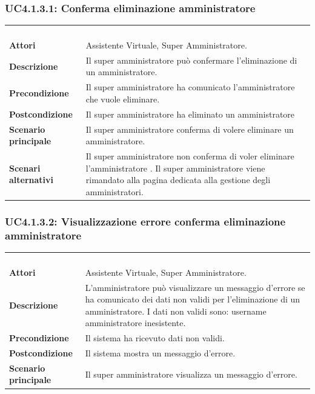 \subsubsection{UC4.1.3.1: Conferma eliminazione amministratore}
\label{UC4.1.3.1}
\begin{longtable}{l|p{10cm}}
	\rowcolor[gray]{0.8} \multicolumn{2}{c}{} \\
	\rowcolor[gray]{0.8} \multicolumn{2}{c}{\textbf{UC4.1.3.1 - Conferma eliminazione amministratore}} \\
	\rowcolor[gray]{0.8} \multicolumn{2}{c}{} \\
	\hline
	&\\
	\textbf{Attori} & Assistente Virtuale, Super Amministratore.\\[7pt]
	\textbf{Descrizione} & Il super amministratore può confermare l'eliminazione di un amministratore.\\[7pt]
	\textbf{Precondizione} & Il super amministratore ha comunicato l'amministratore che vuole eliminare.\\[7pt]
	\textbf{Postcondizione} & Il super amministratore ha eliminato un amministratore\\[7pt]
	\textbf{Scenario principale} &Il super amministratore conferma di volere eliminare un amministratore.\\[7pt]
	\textbf{Scenari alternativi} & Il super amministratore non conferma di voler eliminare l'amministratore . Il super amministratore viene rimandato alla pagina dedicata alla gestione degli amministratori.\\[7pt]\hline
\end{longtable}

\subsubsection{UC4.1.3.2: Visualizzazione errore conferma eliminazione amministratore}
\label{UC4.1.3.2}
\begin{longtable}{l|p{10cm}}
	\rowcolor[gray]{0.8} \multicolumn{2}{c}{} \\
	\rowcolor[gray]{0.8} \multicolumn{2}{c}{\textbf{UC4.1.3.2 - Visualizzazione errore conferma eliminazione amministratore}} \\
	\rowcolor[gray]{0.8} \multicolumn{2}{c}{} \\
	\hline
	&\\
	\textbf{Attori} & Assistente Virtuale, Super Amministratore.\\[7pt]
	\textbf{Descrizione} & L'amministratore può visualizzare un messaggio d'errore se ha comunicato dei dati non validi per l'eliminazione di un amministratore.
	I dati non validi sono: username amministratore inesistente.\\[7pt]
	\textbf{Precondizione} & Il sistema ha ricevuto dati non validi.\\[7pt]
	\textbf{Postcondizione} & Il sistema mostra un messaggio d'errore.\\[7pt]
	\textbf{Scenario principale} &Il super amministratore visualizza un messaggio d'errore.\\[7pt]\hline
\end{longtable}

